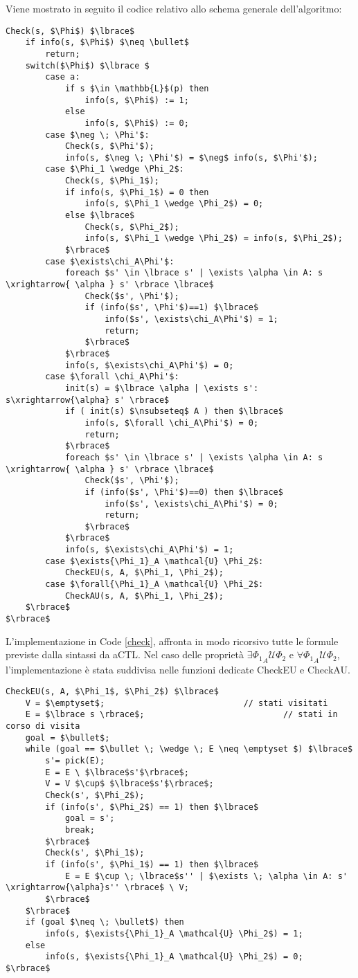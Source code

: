 Viene mostrato in seguito il codice relativo allo schema generale dell'algoritmo:
\\

\begin{lstlisting}[mathescape, caption= Schema generale dell'algoritmo, label=check]
Check(s, $\Phi$) $\lbrace$	
	if info(s, $\Phi$) $\neq \bullet$
		return;	
	switch($\Phi$) $\lbrace	$
		case a: 
			if s $\in \mathbb{L}$(p) then
				info(s, $\Phi$) := 1;
			else
				info(s, $\Phi$) := 0;
		case $\neg \; \Phi'$:
			Check(s, $\Phi'$);
			info(s, $\neg \; \Phi'$) = $\neg$ info(s, $\Phi'$);
		case $\Phi_1 \wedge \Phi_2$:
			Check(s, $\Phi_1$);
			if info(s, $\Phi_1$) = 0 then
				info(s, $\Phi_1 \wedge \Phi_2$) = 0;
			else $\lbrace$
				Check(s, $\Phi_2$);
				info(s, $\Phi_1 \wedge \Phi_2$) = info(s, $\Phi_2$);
			$\rbrace$
		case $\exists\chi_A\Phi'$:
			foreach $s' \in \lbrace s' | \exists \alpha \in A: s  \xrightarrow{ \alpha } s' \rbrace \lbrace$
				Check($s', \Phi'$);
				if (info($s', \Phi'$)==1) $\lbrace$
					info($s', \exists\chi_A\Phi'$) = 1;
					return;
				$\rbrace$
			$\rbrace$
			info(s, $\exists\chi_A\Phi'$) = 0;
		case $\forall \chi_A\Phi'$:
			init(s) = $\lbrace \alpha | \exists s': s\xrightarrow{\alpha} s' \rbrace$
			if ( init(s) $\nsubseteq$ A ) then $\lbrace$
				info(s, $\forall \chi_A\Phi'$) = 0;
				return;
			$\rbrace$
			foreach $s' \in \lbrace s' | \exists \alpha \in A: s  \xrightarrow{ \alpha } s' \rbrace \lbrace$
				Check($s', \Phi'$);
				if (info($s', \Phi'$)==0) then $\lbrace$
					info($s', \exists\chi_A\Phi'$) = 0;
					return;
				$\rbrace$
			$\rbrace$
			info(s, $\exists\chi_A\Phi'$) = 1;
		case $\exists{\Phi_1}_A \mathcal{U} \Phi_2$:
			CheckEU(s, A, $\Phi_1, \Phi_2$);
		case $\forall{\Phi_1}_A \mathcal{U} \Phi_2$:
			CheckAU(s, A, $\Phi_1, \Phi_2$);
	$\rbrace$
$\rbrace$
\end{lstlisting}

L'implementazione in Code \ref{check}, affronta in modo ricorsivo tutte le formule previste dalla sintassi da aCTL.
Nel caso delle proprietà $\exists{\Phi_1}_A \mathcal{U} \Phi_2$ e $\forall{\Phi_1}_A \mathcal{U} \Phi_2$, l'implementazione è stata suddivisa nelle funzioni dedicate CheckEU e CheckAU.
\\

\begin{lstlisting}[mathescape, caption=Implementazione di CheckEU]
CheckEU(s, A, $\Phi_1$, $\Phi_2$) $\lbrace$
	V = $\emptyset$; 							// stati visitati
	E = $\lbrace s \rbrace$; 							// stati in corso di visita
	goal = $\bullet$;
	while (goal == $\bullet \; \wedge \; E \neq \emptyset $) $\lbrace$
		s'= pick(E);
		E = E \ $\lbrace$s'$\rbrace$;
		V = V $\cup$ $\lbrace$s'$\rbrace$;
		Check(s', $\Phi_2$);
		if (info(s', $\Phi_2$) == 1) then $\lbrace$
			goal = s';
			break;
		$\rbrace$
		Check(s', $\Phi_1$);
		if (info(s', $\Phi_1$) == 1) then $\lbrace$
			E = E $\cup \; \lbrace$s'' | $\exists \; \alpha \in A: s' \xrightarrow{\alpha}s'' \rbrace$ \ V;
		$\rbrace$	
	$\rbrace$
	if (goal $\neq \; \bullet$) then
		info(s, $\exists{\Phi_1}_A \mathcal{U} \Phi_2$) = 1;
	else
		info(s, $\exists{\Phi_1}_A \mathcal{U} \Phi_2$) = 0;
$\rbrace$
\end{lstlisting}

